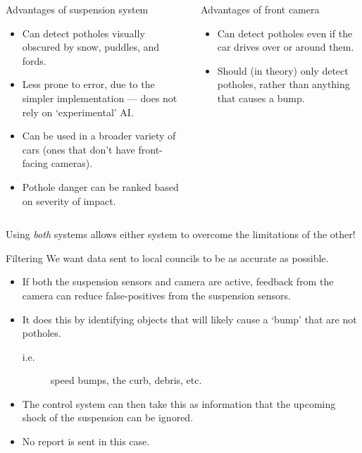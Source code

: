 \documentclass{beamer}
\begin{document}
\begin{frame}
    \begin{columns}

        \begin{block}{Advantages of suspension system}
            \begin{itemize}
                \item Can detect potholes visually obscured by snow, puddles, and fords.
                \item Less prone to error, due to the simpler implementation --- does not rely on `experimental' AI.
                \item Can be used in a broader variety of cars (ones that don't have front-facing cameras).
                \item Pothole danger can be ranked based on severity of impact.
            \end{itemize}
        \end{block}


        \begin{block}{Advantages of front camera}
            \begin{itemize}
                \item Can detect potholes even if the car drives over or around them.
                \item Should (in theory) \alert{only} detect potholes, rather than anything that causes a bump.
            \end{itemize}
        \end{block}

    \end{columns}

    \vspace{0.4cm}
    Using \emph{both} systems allows either system to overcome the limitations of the other!
\end{frame}

\begin{frame}{Filtering}
    We want data sent to local councils to be as accurate as possible.
    \begin{itemize}
        \item If both the suspension sensors and camera are active, feedback from the camera can reduce false-positives from the suspension sensors.
        \item It does this by identifying objects that will likely cause a `bump' that are \alert{not} potholes.
        \begin{description}
            \item[i.e.] speed bumps, the curb, debris, etc.
        \end{description}
        \item The control system can then take this as information that the upcoming shock of the suspension can be ignored.
        \item \alert{No} report is sent in this case.
    \end{itemize}
\end{frame}
\end{document}

